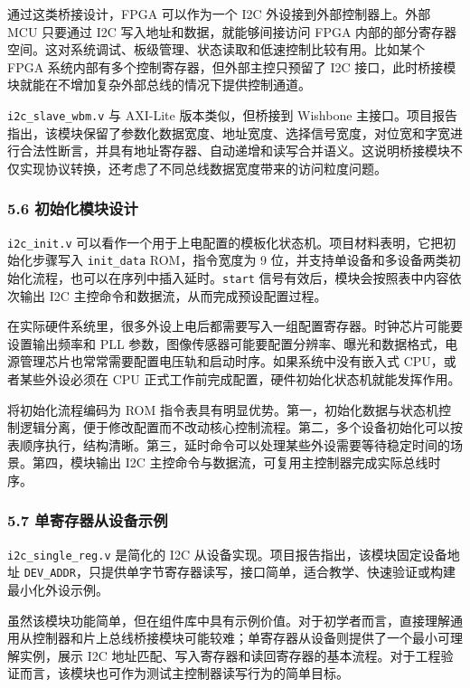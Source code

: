 通过这类桥接设计，FPGA 可以作为一个 I2C 外设接到外部控制器上。外部 MCU 只要通过 I2C 写入地址和数据，就能够间接访问 FPGA 内部的部分寄存器空间。这对系统调试、板级管理、状态读取和低速控制比较有用。比如某个 FPGA 系统内部有多个控制寄存器，但外部主控只预留了 I2C 接口，此时桥接模块就能在不增加复杂外部总线的情况下提供控制通道。

\texttt{i2c\_slave\_wbm.v} 与 AXI-Lite 版本类似，但桥接到 Wishbone 主接口。项目报告指出，该模块保留了参数化数据宽度、地址宽度、选择信号宽度，对位宽和字宽进行合法性断言，并具有地址寄存器、自动递增和读写合并语义。这说明桥接模块不仅实现协议转换，还考虑了不同总线数据宽度带来的访问粒度问题。

\subsubsection{5.6 初始化模块设计}\label{ux521dux59cbux5316ux6a21ux5757ux8bbeux8ba1}

\texttt{i2c\_init.v} 可以看作一个用于上电配置的模板化状态机。项目材料表明，它把初始化步骤写入 \texttt{init\_data} ROM，指令宽度为 9 位，并支持单设备和多设备两类初始化流程，也可以在序列中插入延时。\texttt{start} 信号有效后，模块会按照表中内容依次输出 I2C 主控命令和数据流，从而完成预设配置过程。

在实际硬件系统里，很多外设上电后都需要写入一组配置寄存器。时钟芯片可能要设置输出频率和 PLL 参数，图像传感器可能要配置分辨率、曝光和数据格式，电源管理芯片也常常需要配置电压轨和启动时序。如果系统中没有嵌入式 CPU，或者某些外设必须在 CPU 正式工作前完成配置，硬件初始化状态机就能发挥作用。

将初始化流程编码为 ROM 指令表具有明显优势。第一，初始化数据与状态机控制逻辑分离，便于修改配置而不改动核心控制流程。第二，多个设备初始化可以按表顺序执行，结构清晰。第三，延时命令可以处理某些外设需要等待稳定时间的场景。第四，模块输出 I2C 主控命令与数据流，可复用主控制器完成实际总线时序。

\subsubsection{5.7 单寄存器从设备示例}\label{ux5355ux5bc4ux5b58ux5668ux4eceux8bbeux5907ux793aux4f8b}

\texttt{i2c\_single\_reg.v} 是简化的 I2C 从设备实现。项目报告指出，该模块固定设备地址 \texttt{DEV\_ADDR}，只提供单字节寄存器读写，接口简单，适合教学、快速验证或构建最小化外设示例。

虽然该模块功能简单，但在组件库中具有示例价值。对于初学者而言，直接理解通用从控制器和片上总线桥接模块可能较难；单寄存器从设备则提供了一个最小可理解实例，展示 I2C 地址匹配、写入寄存器和读回寄存器的基本流程。对于工程验证而言，该模块也可作为测试主控制器读写行为的简单目标。

